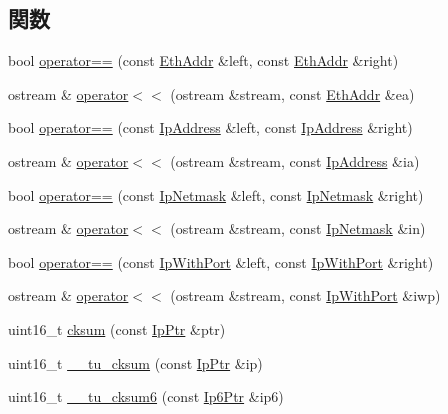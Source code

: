 \subsection*{関数}
\begin{DoxyCompactItemize}
\item 
bool \hyperlink{namespaceNet_a1f08134ae5bedef31ccc578238491634}{operator==} (const \hyperlink{structNet_1_1EthAddr}{EthAddr} \&left, const \hyperlink{structNet_1_1EthAddr}{EthAddr} \&right)
\item 
ostream \& \hyperlink{namespaceNet_a6ee6ae0fe485e2f01a9b42ab77329d7d}{operator$<$$<$} (ostream \&stream, const \hyperlink{structNet_1_1EthAddr}{EthAddr} \&ea)
\item 
bool \hyperlink{namespaceNet_a810805db3cea409a0911b6c62204e387}{operator==} (const \hyperlink{structNet_1_1IpAddress}{IpAddress} \&left, const \hyperlink{structNet_1_1IpAddress}{IpAddress} \&right)
\item 
ostream \& \hyperlink{namespaceNet_a375cbbb01685429061c5da6797bdfcf5}{operator$<$$<$} (ostream \&stream, const \hyperlink{structNet_1_1IpAddress}{IpAddress} \&ia)
\item 
bool \hyperlink{namespaceNet_a357f3a34efde4268307952994cc42425}{operator==} (const \hyperlink{structNet_1_1IpNetmask}{IpNetmask} \&left, const \hyperlink{structNet_1_1IpNetmask}{IpNetmask} \&right)
\item 
ostream \& \hyperlink{namespaceNet_ac5d1eaf544b16bb39dbcf35cf2630b24}{operator$<$$<$} (ostream \&stream, const \hyperlink{structNet_1_1IpNetmask}{IpNetmask} \&in)
\item 
bool \hyperlink{namespaceNet_a5ae44ae1ca684e220c0c9faaa1c5ad8e}{operator==} (const \hyperlink{structNet_1_1IpWithPort}{IpWithPort} \&left, const \hyperlink{structNet_1_1IpWithPort}{IpWithPort} \&right)
\item 
ostream \& \hyperlink{namespaceNet_a0e836533fd8b6ae417355a2122f2f48c}{operator$<$$<$} (ostream \&stream, const \hyperlink{structNet_1_1IpWithPort}{IpWithPort} \&iwp)
\item 
uint16\_\-t \hyperlink{namespaceNet_a7c7758a7af16c9b808dcb8ddf7aa1a34}{cksum} (const \hyperlink{classNet_1_1IpPtr}{IpPtr} \&ptr)
\item 
uint16\_\-t \hyperlink{namespaceNet_aa160b2c868a18f1793e719a750f41891}{\_\-\_\-tu\_\-cksum} (const \hyperlink{classNet_1_1IpPtr}{IpPtr} \&ip)
\item 
uint16\_\-t \hyperlink{namespaceNet_ac143008a44a1456ad6b820780ca5980e}{\_\-\_\-tu\_\-cksum6} (const \hyperlink{classNet_1_1Ip6Ptr}{Ip6Ptr} \&ip6)

\end{DoxyCompactItemize}
